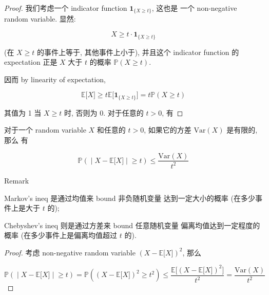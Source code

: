 \begin{proof}

我们考虑一个 indicator function \(\mathbf{1}_{\{{\mathit{X} \geq \mathit{t}}\}}\), 这也是 一个 non-negative random variable. 显然:

\[\mathit{X} \geq \mathit{t} \cdot \mathbf{1}_{\{{\mathit{X} \geq \mathit{t}}\}}\]

(在 \(\mathit{X} \geq \mathit{t}\) 的事件上等于, 其他事件上小于), 并且这个 indicator function 的 expectation 正是 \(\mathit{X}\) 大于 \(\mathit{t}\) 的概率 \(\mathbb{P}(\mathit{X} \geq \mathit{t})\).

因而 by linearity of expectation,

\[\mathbb{E}\lbrack\mathit{X}\rbrack \geq \mathit{t}\mathbb{E}\lbrack\mathbf{1}_{\{{\mathit{X} \geq \mathit{t}}\}}\rbrack = \mathit{t}\mathbb{P}(\mathit{X} \geq \mathit{t})\]

其值为 1 当 \(\mathit{X} \geq \mathit{t}\) 时, 否则为 0. 对于任意的 \(\mathit{t} > 0\), 有

\end{proof}

\begin{corollary}{}

对于一个 random variable \(\mathit{X}\) 和任意的 \(\mathit{t} > 0\), 如果它的方差 \(\text{Var}(\mathit{X})\) 是有限的, 那么 有

\[\left. \mathbb{P}( \middle| \mathit{X} - \mathbb{E}\lbrack\mathit{X}\rbrack \middle| \geq \mathit{t}) \leq \frac{\text{Var}(\mathit{X})}{\mathit{t}^{2}} \right.\]

\end{corollary}

\begin{qlremark}{Remark}

Markov's ineq 是通过均值来 bound 非负随机变量 达到一定大小的概率 (在多少事件上是大于 \(\mathit{t}\) 的);

Chebyshev's ineq 则是通过方差来 bound 任意随机变量 偏离均值达到一定程度的概率 (在多少事件上是偏离均值超过 \(\mathit{t}\) 的).

\end{qlremark}

\begin{proof}

考虑 non-negative random variable \((\mathit{X} - \mathbb{E}\lbrack\mathit{X}\rbrack)^{2}\), 那么

\[\left. \mathbb{P}( \middle| \mathit{X} - \mathbb{E}\lbrack\mathit{X}\rbrack \middle| \geq \mathit{t}) = \mathbb{P}((\mathit{X} - \mathbb{E}\lbrack\mathit{X}\rbrack)^{2} \geq \mathit{t}^{2}) \leq \frac{\mathbb{E}\lbrack(\mathit{X} - \mathbb{E}\lbrack\mathit{X}\rbrack)^{2}\rbrack}{\mathit{t}^{2}} = \frac{\text{Var}(\mathit{X})}{\mathit{t}^{2}} \right.\]

\end{proof}

